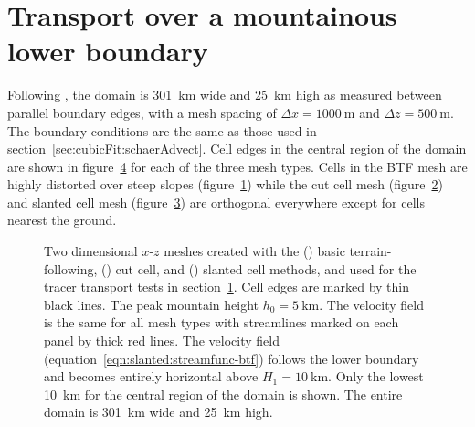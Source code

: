 \section{Transport over a mountainous lower boundary}
\label{sec:slanted:mountainAdvect}

Following \citet{schaer2002}, the domain is \SI{301}{\kilo\meter} wide and \SI{25}{\kilo\meter} high as measured between parallel boundary edges, with a mesh spacing of $\Delta x = \SI{1000}{\meter}$ and $\Delta z = \SI{500}{\meter}$.  The boundary conditions are the same as those used in section~\ref{sec:cubicFit:schaerAdvect}.
Cell edges in the central region of the domain are shown in figure~\ref{fig:slanted:mountainAdvect:meshes} for each of the three mesh types.
Cells in the BTF mesh are highly distorted over steep slopes (figure~\ref{fig:slanted:mountainAdvect:meshes:btf}) while the cut cell mesh (figure~\ref{fig:slanted:mountainAdvect:meshes:cutCell}) and slanted cell mesh (figure~\ref{fig:slanted:mountainAdvect:meshes:slantedCell}) are orthogonal everywhere except for cells nearest the ground.

\begin{figure}
	\centering
	\begin{subfigure}{\textwidth}
		\label{fig:slanted:mountainAdvect:meshes:btf}
	\end{subfigure}
	\begin{subfigure}{\textwidth}
		\label{fig:slanted:mountainAdvect:meshes:cutCell}
	\end{subfigure}
	\begin{subfigure}{\textwidth}
		\label{fig:slanted:mountainAdvect:meshes:slantedCell}
	\end{subfigure}
%
	\caption{Two dimensional $x$-$z$ meshes created with the () basic terrain-following,
	() cut cell, and
	() slanted cell methods, and used for the tracer transport tests in section~\ref{sec:slanted:mountainAdvect}.  Cell edges are marked by thin black lines.  The peak mountain height $h_0 = \SI{5}{\kilo\meter}$.
The velocity field is the same for all mesh types with streamlines marked on each panel by thick red lines.
The velocity field (equation~\ref{eqn:slanted:streamfunc-btf}) follows the lower boundary and becomes entirely horizontal above $H_1 = \SI{10}{\kilo\meter}$.
Only the lowest \SI{10}{\kilo\meter} for the central region of the domain is shown.  The entire domain is \SI{301}{\kilo\meter} wide and \SI{25}{\kilo\meter} high.}
	\label{fig:slanted:mountainAdvect:meshes}
\end{figure}


